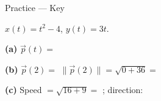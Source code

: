 \documentclass[10pt]{article}
\begin{document}
\vspace{0.08in}

\begin{notesbox}{Practice --- Key}
\small

$x(t)=t^{2}-4$, $y(t)=3t$.

\textbf{(a)} $\vec{p}(t) = $ 

\vspace{0.08in}
\textbf{(b)} $\vec{p}(2) = $  \qquad
$\|\vec{p}(2)\| = \sqrt{0+36} = $ 

\vspace{0.08in}
\textbf{(c)} Speed $= \sqrt{16+9} = $ ; direction:
\end{notesbox}
\end{document}
